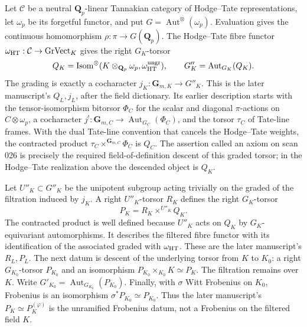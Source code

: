 Let $\mathcal C$ be a neutral $\mathbf Q_p$-linear Tannakian category
of Hodge--Tate representations, let $\omega_p$ be its forgetful functor,
and put $G=\operatorname{Aut}^{\otimes}(\omega_p)$.
Evaluation gives the continuous homomorphism
$\rho:\pi\to G(\mathbf Q_p)$.
The Hodge--Tate fibre functor
$\omega_{\rm HT}:\mathcal C\to\operatorname{GrVect}_K$ gives the
right $G_K$-torsor
\[
 Q_K=\operatorname{Isom}^{\otimes}
       (K\otimes_{\mathbf Q_p}\omega_p,\omega_{\rm HT}^{\rm ungr}),
 \qquad G''_K=\operatorname{Aut}_{G_K}(Q_K).
\]
The grading is exactly a cocharacter
$j_K:\mathbf G_{m,K}\to G''_K$.
This is the later manuscript's $Q_L,j_L$, after the field dictionary.
Its earlier description starts with the tensor-isomorphism bitorsor
$\Phi_C$ for the scalar and diagonal $\pi$-actions on
$C\otimes\omega_p$, a cocharacter
$j^!:\mathbf G_{m,C}\to\operatorname{Aut}_{G_C}(\Phi_C)$,
and the torsor $\tau_C$ of Tate-line frames.  With the dual Tate-line
convention that cancels the Hodge--Tate weights, the contracted product
$\tau_C\times^{\mathbf G_{m,C}}\Phi_C$ is $Q_C$.
The assertion called an axiom on scan 026 is precisely the required
field-of-definition descent of this graded torsor; in the Hodge--Tate
realization above the descended object is $Q_K$.

Let $U''_K\subset G''_K$ be the unipotent subgroup acting trivially
on the graded of the filtration induced by $j_K$.  A right
$U''_K$-torsor $R_K$ defines the right $G_K$-torsor
\[
 P_K=R_K\times^{U''_K}Q_K.
\]
The contracted product is well defined because $U''_K$ acts on $Q_K$
by $G_K$-equivariant automorphisms.  It describes the filtered fibre
functor with its identification of the associated graded with
$\omega_{\rm HT}$.  These are the later manuscript's $R_L,P_L$.
The next datum is descent of the underlying torsor from $K$ to $K_0$:
a right $G_{K_0}$-torsor $P_{K_0}$ and an isomorphism
$P_{K_0}\times_{K_0}K\simeq P_K$.
The filtration remains over $K$.  Write
$G'_{K_0}=\operatorname{Aut}_{G_{K_0}}(P_{K_0})$.
Finally, with $\sigma$ Witt Frobenius on $K_0$, Frobenius is an
isomorphism $\sigma^*P_{K_0}\simeq P_{K_0}$.
Thus the later manuscript's $P_K\simeq P_K^{(\varphi)}$ is the
unramified Frobenius datum, not a Frobenius on the filtered field $K$.

